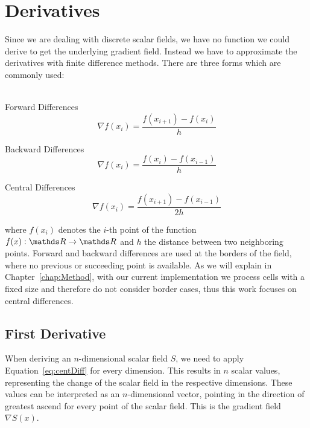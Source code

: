 \section{Derivatives}\label{sec:derivatives}

Since we are dealing with discrete scalar fields, we have no function we
could derive to get the underlying gradient field. Instead we have to
approximate the derivatives with finite difference methods. There are
three forms which are commonly used:\\
\\
\begin{inparaenum}[(a)]
  \item Forward Differences
  \begin{equation}
    \nabla f(x_i) = \frac{f(x_{i+1}) - f(x_i)}{h}
  \end{equation}
  \item Backward Differences
  \begin{equation}
    \nabla f(x_i) = \frac{f(x_i) - f(x_{i-1})}{h}
  \end{equation}
  \item Central Differences
  \begin{equation}\label{eq:centDiff}
    \nabla f(x_i) = \frac{f(x_{i+1}) - f(x_{i-1})}{2h}
  \end{equation}
\end{inparaenum}
where $f(x_i)$ denotes the $i$-th point of the function $f(x): \real
\rightarrow \real$ and $h$ the distance between two neighboring points.
Forward and backward differences are used at the borders of the field,
where no previous or succeeding point is available. As we will explain
in Chapter~\ref{chap:Method}, with our current implementation we process
cells with a fixed size and therefore do not consider border cases, thus
this work focuses on central differences.

\subsection{First Derivative}

When deriving an $n$-dimensional scalar field $S$, we need to apply
Equation~\ref{eq:centDiff} for every dimension. This results in $n$
scalar values, representing the change of the scalar field in the
respective dimensions. These values can be interpreted as an
$n$-dimensional vector, pointing in the direction of greatest ascend for
every point of the scalar field. This is the gradient field $\nabla
S(x)$.

